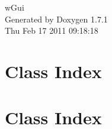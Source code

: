 \documentclass[a4paper]{book}
\begin{document}
\hypersetup{pageanchor=false}
\begin{titlepage}
\vspace*{7cm}
\begin{center}
{\Large wGui }\\
\vspace*{1cm}
{\large Generated by Doxygen 1.7.1}\\
\vspace*{0.5cm}
{\small Thu Feb 17 2011 09:18:18}\\
\end{center}
\end{titlepage}
\clearemptydoublepage
{}
\tableofcontents
\clearemptydoublepage
{}
\hypersetup{pageanchor=true}
\chapter{Class Index}

\chapter{Class Index}

\end{document}
